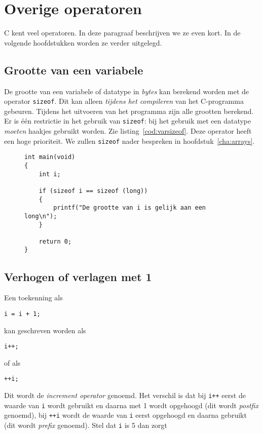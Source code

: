 \section{Overige operatoren}
C kent veel operatoren. In deze paragraaf beschrijven we ze even kort. In de volgende hoofdstukken worden ze verder uitgelegd.

\subsection{Grootte van een variabele}
De grootte van een variabele of datatype in \textsl{bytes} kan berekend worden met de operator \texttt{sizeof}. Dit kan alleen \textsl{tijdens het compileren} van het C-programma gebeuren. Tijdens het uitvoeren van het programma zijn alle grootten berekend. Er is één restrictie in het gebruik van \texttt{sizeof}: bij het gebruik met een datatype \textsl{moeten} haakjes gebruikt worden. Zie listing~\ref{cod:varsizeof}. Deze operator heeft een hoge prioriteit. We zullen \texttt{sizeof} nader bespreken in hoofdstuk~\ref{cha:arrays}.

\begin{figure}[!ht]
\begin{lstlisting}[caption=Gebruik van \texttt{sizeof}.,label=cod:varsizeof]
int main(void)
{
	int i;

    if (sizeof i == sizeof (long))
    {
        printf("De grootte van i is gelijk aan een long\n");
    }

    return 0;
}
\end{lstlisting}
\end{figure}

\subsection{Verhogen of verlagen met 1}
Een toekenning als

\hspace*{1em}\texttt{i = i + 1;}

kan geschreven worden als

\hspace*{1em}\texttt{i++;}

of als 

\hspace*{1em}\texttt{++i;}

Dit wordt de \textsl{increment operator}\indexop{++} genoemd. Het verschil is dat bij \texttt{i++} eerst de waarde van \texttt{i} wordt gebruikt en daarna met 1 wordt opgehoogd (dit wordt \textsl{postfix} genoemd), bij \texttt{++i} wordt de waarde van \texttt{i} eerst opgehoogd en daarna gebruikt (dit wordt \textsl{prefix} genoemd). Stel dat \texttt{i} is 5 dan zorgt

